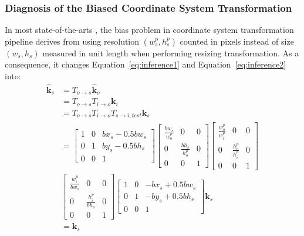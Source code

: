 \documentclass[10pt,journal,compsoc]{IEEEtran}
\begin{document}
\subsubsection{Diagnosis of the Biased Coordinate System Transformation}
\label{sec:decst}
In most state-of-the-arts \cite{CPN,SBNet,MSPN,HRNet,Higher}, the bias problem in coordinate system transformation pipeline derives from using resolution $(w_s^p,h_s^p)$ counted in pixels instead of size $(w_s,h_s)$ measured in unit length when performing resizing transformation. As a consequence, it changes Equation~\ref{eq:inference1} and Equation~\ref{eq:inference2} into:
\begin{equation}
    \label{eq:inference3}
    \begin{split}
    \hat{\textbf{k}}_s  &= T_{o\rightarrow s}\hat{\textbf{k}}_o\\
                        &= T_{o\rightarrow s}T_{i\rightarrow o}\textbf{k}_i\\
                        &= T_{o\rightarrow s}T_{i\rightarrow o}T_{s\rightarrow i, test}\textbf{k}_s\\
                        &= \begin{bmatrix} 1 & 0 & bx_s-0.5bw_s \\
                    0 & 1 & by_s-0.5bh_s \\
                    0 & 0 &1 \end{bmatrix}\begin{bmatrix} \frac{bw_s}{w_o^p} & 0 & 0 \\
                    0 & \frac{bh_s}{h_o^p} & 0 \\
                    0 & 0 &1 \end{bmatrix}\begin{bmatrix} \frac{w_o^p}{w_i^p} & 0 & 0 \\
                    0 & \frac{h_o^p}{h_i^p} & 0 \\
                    0 & 0 &1 \end{bmatrix}\\
                    &\begin{bmatrix} \frac{w_i^p}{bw_s} & 0 & 0 \\
                    0 & \frac{h_i^p}{bh_s} & 0 \\
                    0 & 0 &1 \end{bmatrix}\begin{bmatrix} 1 & 0 & -bx_s+0.5bw_s \\
                    0 & 1 & -by_s+0.5bh_s \\
                    0 & 0 &1 \end{bmatrix}\textbf{k}_s\\
                        &= \textbf{k}_s
    \end{split}
\end{equation}
\end{document}

